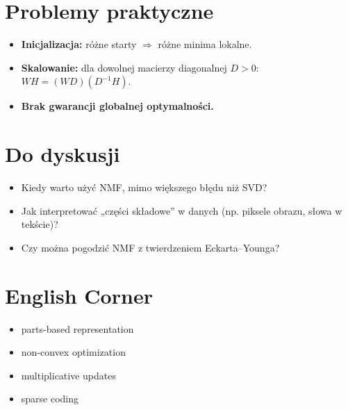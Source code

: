 \documentclass[12pt]{article}
\begin{document}
\section*{Problemy praktyczne}
\begin{itemize}
  \item \textbf{Inicjalizacja:} różne starty $\Rightarrow$ różne minima lokalne.
  \item \textbf{Skalowanie:} dla dowolnej macierzy diagonalnej $D>0$: $WH = (WD)(D^{-1}H)$.
  \item \textbf{Brak gwarancji globalnej optymalności.}
\end{itemize}

\section*{Do dyskusji}
\begin{itemize}
  \item Kiedy warto użyć NMF, mimo większego błędu niż SVD?
  \item Jak interpretować „części składowe” w danych (np. piksele obrazu, słowa w tekście)?
  \item Czy można pogodzić NMF z twierdzeniem Eckarta--Younga?
\end{itemize}

\section*{English Corner}
\begin{itemize}
  \item parts-based representation
  \item non-convex optimization
  \item multiplicative updates
  \item sparse coding
\end{itemize}
\end{document}
